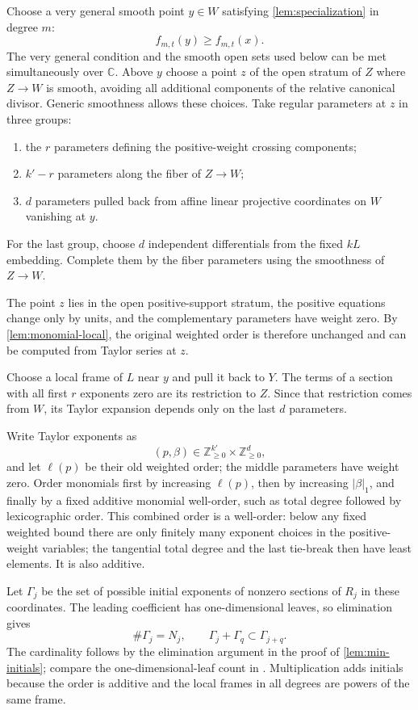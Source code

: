 Choose a very general smooth point $y\in W$ satisfying \cref{lem:specialization} in degree $m$:
\begin{equation}\label{eq:center-specialization}
 f_{m,t}(y)\ge f_{m,t}(x).
\end{equation}
The very general condition and the smooth open sets used below can be met simultaneously over $\mathbb{C}$. Above $y$ choose a point $z$ of the open stratum of $Z$ where $Z\to W$ is smooth, avoiding all additional components of the relative canonical divisor. Generic smoothness allows these choices. Take regular parameters at $z$ in three groups:
\begin{enumerate}
 \item the $r$ parameters defining the positive-weight crossing
 components;
 \item $k'-r$ parameters along the fiber of $Z\to W$;
 \item $d$ parameters pulled back from affine linear projective
 coordinates on $W$ vanishing at $y$.
\end{enumerate}
For the last group, choose $d$ independent differentials from the fixed $kL$ embedding. Complete them by the fiber parameters using the smoothness of $Z\to W$.

The point $z$ lies in the open positive-support stratum, the positive equations change only by units, and the complementary parameters have weight zero. By \cref{lem:monomial-local}, the original weighted order is therefore unchanged and can be computed from Taylor series at $z$.

Choose a local frame of $L$ near $y$ and pull it back to $Y$. The terms of a section with all first $r$ exponents zero are its restriction to $Z$. Since that restriction comes from $W$, its Taylor expansion depends only on the last $d$ parameters.

Write Taylor exponents as
\[
 (p,\beta)\in\mathbb{Z}_{\ge0}^{k'}\times\mathbb{Z}_{\ge0}^{d},
\]
and let $\ell(p)$ be their old weighted order; the middle parameters have weight zero. Order monomials first by increasing $\ell(p)$, then by increasing $|\beta|_1$, and finally by a fixed additive monomial well-order, such as total degree followed by lexicographic order. This combined order is a well-order: below any fixed weighted bound there are only finitely many exponent choices in the positive-weight variables; the tangential total degree and the last tie-break then have least elements. It is also additive.

Let $\Gamma_j$ be the set of possible initial exponents of nonzero sections of $R_j$ in these coordinates. The leading coefficient has one-dimensional leaves, so elimination gives
\begin{equation}\label{eq:center-semigroup}
 \#\Gamma_j=N_j,
 \qquad \Gamma_j+\Gamma_q\subset\Gamma_{j+q}.
\end{equation}
The cardinality follows by the elimination argument in the proof of \cref{lem:min-initials}; compare the one-dimensional-leaf count in \cite[Proposition~2.6]{KK12}. Multiplication adds initials because the order is additive and the local frames in all degrees are powers of the same frame.

